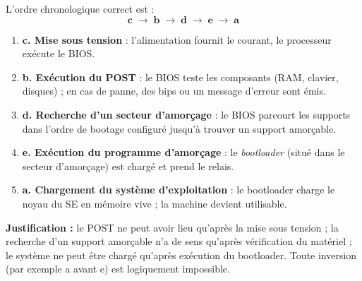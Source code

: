 \documentclass[11pt]{article}
\begin{document}
\begin{corrige}
L'ordre chronologique correct est :
\[ \textbf{c} \;\longrightarrow\; \textbf{b} \;\longrightarrow\; \textbf{d} \;\longrightarrow\; \textbf{e} \;\longrightarrow\; \textbf{a} \]
\begin{enumerate}
\item \textbf{c. Mise sous tension} : l'alimentation fournit le courant, le processeur exécute le BIOS.
\item \textbf{b. Exécution du POST} : le BIOS teste les composants (RAM, clavier, disques) ; en cas de panne, des bips ou un message d'erreur sont émis.
\item \textbf{d. Recherche d'un secteur d'amorçage} : le BIOS parcourt les supports dans l'ordre de bootage configuré jusqu'à trouver un support amorçable.
\item \textbf{e. Exécution du programme d'amorçage} : le \emph{bootloader} (situé dans le secteur d'amorçage) est chargé et prend le relais.
\item \textbf{a. Chargement du système d'exploitation} : le bootloader charge le noyau du SE en mémoire vive ; la machine devient utilisable.
\end{enumerate}
\textbf{Justification :} le POST ne peut avoir lieu qu'après la mise sous tension ; la recherche d'un support amorçable n'a de sens qu'après vérification du matériel ; le système ne peut être chargé qu'après exécution du bootloader. Toute inversion (par exemple a avant e) est logiquement impossible.
\end{corrige}
\end{document}
